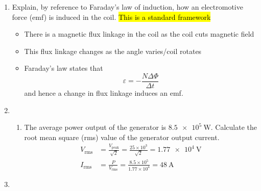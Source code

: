 \documentclass[a4paper,12pt]{article}
\begin{document}
\begin{enumerate}[label=(\alph*)]
  \item Explain, by reference to Faraday's law of induction, how an electromotive force (emf) is induced in the coil. \hl{This is a standard framework}
        \begin{itemize}
          \item There is a magnetic flux linkage in the coil as the coil cuts magnetic field
          \item This flux linkage changes as the angle varies/coil rotates
          \item Faraday's law states that
                $$\varepsilon = -\frac{N\Delta \Phi}{\Delta t}$$
                and hence a change in flux linkage induces an emf.
        \end{itemize}
  \item \begin{enumerate}[label=(\roman*)]
          \item The average power output of the generator is $\SI{8.5e5}{\W}$. Calculate the root mean square (rms) value of the generator output current.
                \begin{align*}
                  V_\text{rms} & = \frac{V_\text{peak}}{\sqrt{2}} = \frac{25\times 10^3}{\sqrt{2}} = \SI{1.77e4}{\V} \\
                  I_\text{rms} & = \frac{P}{V_\text{rms}} = \frac{8.5\times 10^5}{1.77\times 10^4} = \SI{48}{\A}
                \end{align*}
        \end{enumerate}
  \item

\end{enumerate}
\end{document}

